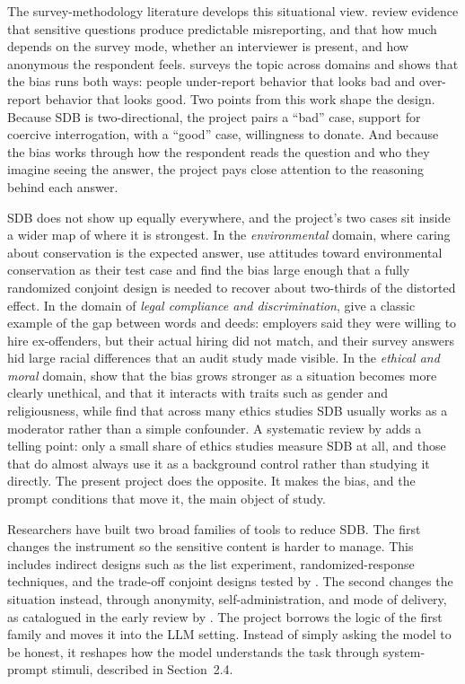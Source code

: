 \documentclass[14pt,a4paper]{extarticle}
\begin{document}
The survey-methodology literature develops this situational view. \textcite{tourangeau2007} review evidence that sensitive questions produce predictable misreporting, and that how much depends on the survey mode, whether an interviewer is present, and how anonymous the respondent feels. \textcite{krumpal2013} surveys the topic across domains and shows that the bias runs both ways: people under-report behavior that looks bad and over-report behavior that looks good. Two points from this work shape the design. Because SDB is two-directional, the project pairs a ``bad'' case, support for coercive interrogation, with a ``good'' case, willingness to donate. And because the bias works through how the respondent reads the question and who they imagine seeing the answer, the project pays close attention to the reasoning behind each answer.

SDB does not show up equally everywhere, and the project's two cases sit inside a wider map of where it is strongest. In the \emph{environmental} domain, where caring about conservation is the expected answer, \textcite{horiuchi2022} use attitudes toward environmental conservation as their test case and find the bias large enough that a fully randomized conjoint design is needed to recover about two-thirds of the distorted effect. In the domain of \emph{legal compliance and discrimination}, \textcite{pagerQuillian2005} give a classic example of the gap between words and deeds: employers said they were willing to hire ex-offenders, but their actual hiring did not match, and their survey answers hid large racial differences that an audit study made visible. In the \emph{ethical and moral} domain, \textcite{chungMonroe2003} show that the bias grows stronger as a situation becomes more clearly unethical, and that it interacts with traits such as gender and religiousness, while \textcite{fernandesRandall1992} find that across many ethics studies SDB usually works as a moderator rather than a simple confounder. A systematic review by \textcite{tan2021} adds a telling point: only a small share of ethics studies measure SDB at all, and those that do almost always use it as a background control rather than studying it directly. The present project does the opposite. It makes the bias, and the prompt conditions that move it, the main object of study.

Researchers have built two broad families of tools to reduce SDB. The first changes the instrument so the sensitive content is harder to manage. This includes indirect designs such as the list experiment, randomized-response techniques, and the trade-off conjoint designs tested by \textcite{horiuchi2022}. The second changes the situation instead, through anonymity, self-administration, and mode of delivery, as catalogued in the early review by \textcite{nederhof1985}. The project borrows the logic of the first family and moves it into the LLM setting. Instead of simply asking the model to be honest, it reshapes how the model understands the task through system-prompt stimuli, described in Section~2.4.
\end{document}
